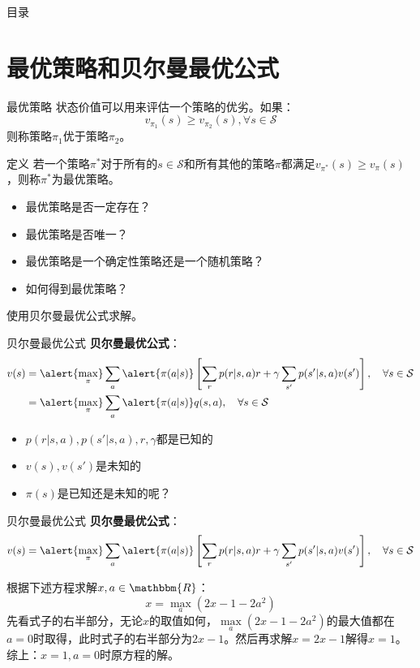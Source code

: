 \begin{frame}{目录}
    \tableofcontents
\end{frame}

\section{最优策略和贝尔曼最优公式}

\begin{frame}{最优策略}
    状态价值可以用来评估一个策略的优劣。如果：
    \[
        v_{\pi_1}(s) \geq v_{\pi_2}(s), \forall s \in \mathcal{S}
    \]
    则称策略$\pi_1$优于策略$\pi_2$。
    \begin{block}{定义}
        若一个策略$\pi^*$对于所有的$s\in \mathcal{S}$和所有其他的策略$\pi$都满足$v_{\pi^*}(s)\geq v_\pi(s)$，则称$\pi^*$为最优策略。
    \end{block}
    \begin{itemize}
        \item 最优策略是否一定存在？
        \item 最优策略是否唯一？
        \item 最优策略是一个确定性策略还是一个随机策略？
        \item 如何得到最优策略？
    \end{itemize}
    使用\alert{贝尔曼最优公式}求解。
\end{frame}

\begin{frame}{贝尔曼最优公式}
    \textbf{贝尔曼最优公式}：
    \[
        \begin{aligned}
            v(s)&=\alert{\underset{\pi}{\max}}\sum_a\alert{\pi(a|s)}\left[\sum_r p(r|s,a)r+\gamma\sum_{s'}p(s'|s,a)v(s')\right], \quad \forall s\in\mathcal{S} \\
            &=\alert{\underset{\pi}{\max}}\sum_a\alert{\pi(a|s)}q(s,a), \quad \forall s\in\mathcal{S}
        \end{aligned}
    \]
    \begin{itemize}
        \item $p(r|s,a),p(s'|s,a),r,\gamma$都是已知的
        \item $v(s),v(s')$是未知的
        \item $\pi(s)$是已知还是未知的呢？
    \end{itemize}
\end{frame}

\begin{frame}{贝尔曼最优公式}
    \textbf{贝尔曼最优公式}：
    \[
        v(s)=\alert{\underset{\pi}{\max}}\sum_a\alert{\pi(a|s)}\left[\sum_r p(r|s,a)r+\gamma\sum_{s'}p(s'|s,a)v(s')\right], \quad \forall s\in\mathcal{S}
    \]
    \begin{examples}
        根据下述方程求解$x,a\in\mathbbm{R}$：
        \[
            x=\underset{a}{\max}(2x-1-2a^2)
        \]
        先看式子的右半部分，无论$x$的取值如何，$\underset{a}{\max}(2x-1-2a^2)$的最大值都在$a=0$时取得，此时式子的右半部分为$2x-1$。然后再求解$x=2x-1$解得$x=1$。综上：$x=1,a=0$时原方程的解。
    \end{examples}
\end{frame}

